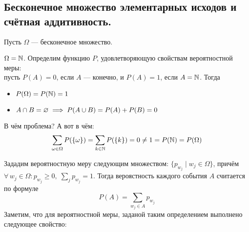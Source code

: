 \subsection{Бесконечное множество элементарных исходов и счётная аддитивность.}
Пусть $\Omega$ --- бесконечное множество.
\begin{example}
    $\Omega = \mathbb{N}$. Определим функцию $P$, удовлетворяющую свойствам вероятностной меры:\\
    пусть $P(A) = 0$, если $A$ --- конечно, и $P(A) = 1$, если $A = \mathbb{N}$. Тогда
    \begin{itemize}
        \item $P(\Omega) = P(\mathbb{N}) = 1$
        \item $A \cap B = \varnothing \implies P(A \cup B) = P(A) + P(B) = 0$
    \end{itemize}
    В чём проблема? А вот в чём:
    \[
        \sum\limits_{\omega \in \Omega} P(\{\omega\}) = \sum\limits_{k \in \mathbb{N}} P(\{k\}) = 0 \neq 1 = P(\mathbb{N}) = P(\Omega)
    \]
\end{example}
Зададим вероятностную меру следующим множеством: $\{p_{w_j}\;|\; w_j \in \Omega\}$, причём
$\forall\, w_j \in \Omega\colon p_{w_j} \geq 0,\; \sum\limits_{j} p_{w_j} = 1$. Тогда вероястность
каждого события $A$ считается по формуле
\[
    P(A) = \sum\limits_{w_j \in A} p_{w_j}
\]
Заметим, что для вероятностной меры, заданой таким определением выполнено следующее свойство:

